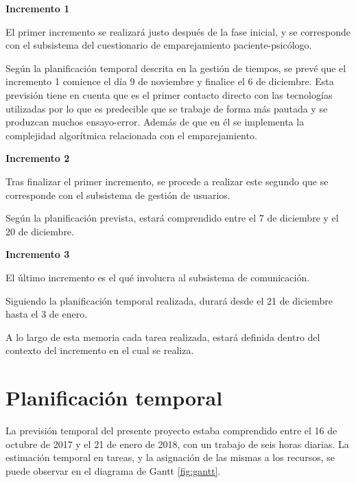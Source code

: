 \textbf{Incremento 1}


El primer incremento se realizará justo después de la fase inicial, y se corresponde con el subsistema del cuestionario de emparejamiento paciente-psicólogo.


Según la planificación temporal descrita en la gestión de tiempos, se prevé que el incremento 1 comience el día 9 de noviembre y finalice el 6 de diciembre. Esta previsión tiene en cuenta que es el primer contacto directo con las tecnologías utilizadas por lo que es predecible que se trabaje de forma más pautada y se produzcan muchos ensayo-error. Además de que en él se implementa la complejidad algorítmica relacionada con el emparejamiento.


\textbf{Incremento 2}


Tras finalizar el primer incremento, se procede a realizar este segundo que se corresponde con el subsistema de gestión de usuarios.


Según la planificación prevista, estará comprendido entre el 7 de diciembre y el 20 de diciembre.


\textbf{Incremento 3}


El último incremento es el qué involucra al subsistema de comunicación. 


Siguiendo la planificación temporal realizada, durará desde el 21 de diciembre hasta el 3 de enero.


A lo largo de esta memoria cada tarea realizada, estará definida dentro del contexto del incremento en el cual se realiza.


\section{Planificación temporal}
La previsión temporal del presente proyecto estaba comprendido entre el 16 de octubre de 2017 y el 21 de enero de 2018, con un trabajo de seis horas diarias. La estimación temporal en tareas, y la asignación de las mismas a los recursos, se puede observar en el diagrama de Gantt \ref{fig:gantt}.

